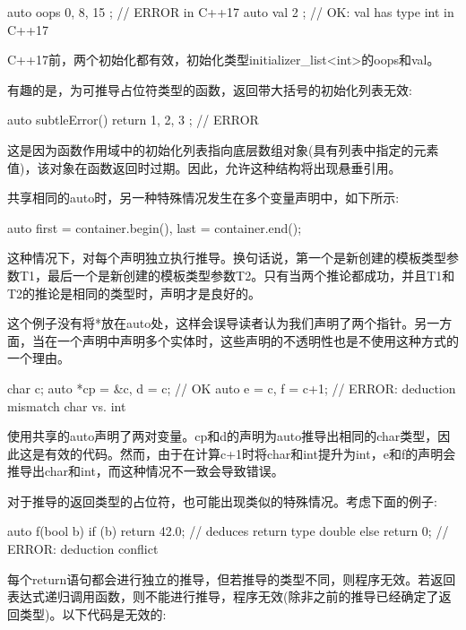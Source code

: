 \begin{cpp}
auto oops { 0, 8, 15 }; // ERROR in C++17
auto val { 2 }; // OK: val has type int in C++17
\end{cpp}

C++17前，两个初始化都有效，初始化类型initializer\_list<int>的oops和val。

有趣的是，为可推导占位符类型的函数，返回带大括号的初始化列表无效:

\begin{cpp}
auto subtleError() {
	return { 1, 2, 3 }; // ERROR
}
\end{cpp}

这是因为函数作用域中的初始化列表指向底层数组对象(具有列表中指定的元素值)，该对象在函数返回时过期。因此，允许这种结构将出现悬垂引用。

共享相同的auto时，另一种特殊情况发生在多个变量声明中，如下所示:

\begin{cpp}
auto first = container.begin(), last = container.end();
\end{cpp}

这种情况下，对每个声明独立执行推导。换句话说，第一个是新创建的模板类型参数T1，最后一个是新创建的模板类型参数T2。只有当两个推论都成功，并且T1和T2的推论是相同的类型时，声明才是良好的。

\begin{notice}
这个例子没有将*放在auto处，这样会误导读者认为我们声明了两个指针。另一方面，当在一个声明中声明多个实体时，这些声明的不透明性也是不使用这种方式的一个理由。
\end{notice}

\begin{cpp}
char c;
auto *cp = &c, d = c; // OK
auto e = c, f = c+1; // ERROR: deduction mismatch char vs. int
\end{cpp}

使用共享的auto声明了两对变量。cp和d的声明为auto推导出相同的char类型，因此这是有效的代码。然而，由于在计算c+1时将char和int提升为int，e和f的声明会推导出char和int，而这种情况不一致会导致错误。

对于推导的返回类型的占位符，也可能出现类似的特殊情况。考虑下面的例子:

\begin{cpp}
auto f(bool b) {
	if (b) {
		return 42.0; // deduces return type double
	} else {
		return 0; // ERROR: deduction conflict
	}
}
\end{cpp}

每个return语句都会进行独立的推导，但若推导的类型不同，则程序无效。若返回表达式递归调用函数，则不能进行推导，程序无效(除非之前的推导已经确定了返回类型)。以下代码是无效的:

